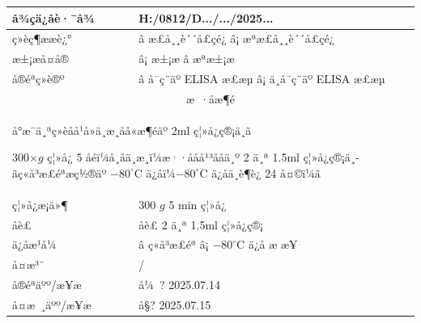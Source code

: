 \documentclass[UTF8,10pt,a4paper,fontset=fandol]{ctexart}
\renewcommand{\arraystretch}{1.15}
\newcommand{\fieldvalue}[1]{#1}
\newcommand{\handwritten}[1]{#1}
\begin{document}
\renewcommand{\arraystretch}{1.35}
\begin{tabularx}{\textwidth}{|p{3.0cm}|X|}
\hline
å¾çä¿å­è·¯å¾
&
\fieldvalue{\handwritten{H:/0812/D.../.../2025...}}
\\
\hline
ç»èç¶ææè¿°
&
\fieldvalue{\handwritten{â æ­£å¸¸è´´å£çé¿}}
\quad â¡ æªæ­£å¸¸è´´å£çé¿
\\
\hline
æ±¡æå¤å®
&
â¡ æ±¡æ
\quad
\fieldvalue{\handwritten{â æªæ±¡æ}}
\\
\hline
å®éªç»è®º
&
\fieldvalue{\handwritten{â å¯ç¨äº ELISA æ£æµ}}
\quad â¡ ä¸å¯ç¨äº ELISA æ£æµ
\\
\hline
\multicolumn{2}{|c|}{æ ·åæ¶é}\\
\hline
\multicolumn{2}{|p{\dimexpr\textwidth-2\tabcolsep-2\arrayrulewidth}|}{
å°æ¯ä¸ªç»èå­å¹å»ä¸æ¸åå«æ¶éäº 2ml ç¦»å¿ç®¡ä¸­ã

300$\times g$ ç¦»å¿ 5 åéï¼å¸åä¸æ¸ï¼æ··ååå¹³ååä¸º 2 ä¸ª 1.5ml ç¦»å¿ç®¡ä¸­ãç«å³æ£éªæç½®äº $-80^\circ$C ä¿å­ï¼$-80^\circ$C ä¿å­ä¸è¶è¿ 24 å¤©ï¼ã
}\\
\hline
ç¦»å¿æ¡ä»¶
&
\fieldvalue{\handwritten{300}}
\quad $g$
\qquad
\fieldvalue{\handwritten{5}}
\quad min ç¦»å¿
\\
\hline
åè£
&
åè£
\fieldvalue{\handwritten{2}}
ä¸ª 1.5ml ç¦»å¿ç®¡
\\
\hline
ä¿å­æ¹å¼
&
\fieldvalue{\handwritten{â ç«å³æ£éª}}
\qquad â¡ $-80^\circ$C ä¿å­ \quad
\underline{\hspace{0.8cm}} æ \quad
\underline{\hspace{0.8cm}} æ¥
\\
\hline
å¤æ³¨
&
\fieldvalue{\handwritten{/}}
\\
\hline
å®éªäºº/æ¥æ
&
\fieldvalue{\handwritten{å¼ ? 2025.07.14}}
\\
\hline
å¤æ ¸äºº/æ¥æ
&
\fieldvalue{\handwritten{å§? 2025.07.15}}
\\
\hline
\end{tabularx}
\end{document}
